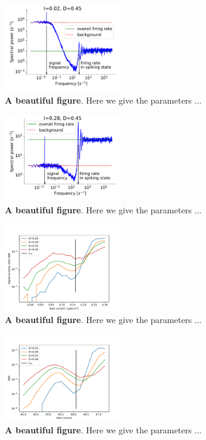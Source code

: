 \documentclass[twocolumn,showpacs,aps,superscriptaddress]{revtex4-1}
\begin{document}
\begin{figure}[h]
	\centering
	\includegraphics[width=0.45\textwidth]{FIGURES/specpaper3.pdf}
	\caption{{\bf A beautiful figure}. Here we give the parameters ...
	}
	\label{spectrumlowcurrent}
\end{figure}
\begin{figure}[h]
	\centering
	\includegraphics[width=0.45\textwidth]{FIGURES/specpaper2.pdf}
	\caption{{\bf A beautiful figure}. Here we give the parameters ...
	}
	\label{spectrumhighcurrent}
\end{figure}
\begin{figure}[h]
	\centering
	\includegraphics[width=0.45\textwidth]{FIGURES/snrsaddlenodecrit.pdf}
	\caption{{\bf A beautiful figure}. Here we give the parameters ...
	}
	\label{snrsaddlenode}
\end{figure}
\begin{figure}[h]
	\centering
	\includegraphics[width=0.45\textwidth]{FIGURES/snranhopfcrit.pdf}
	\caption{{\bf A beautiful figure}. Here we give the parameters ...
	}
	\label{snranhopf}
\end{figure}
\end{document}
